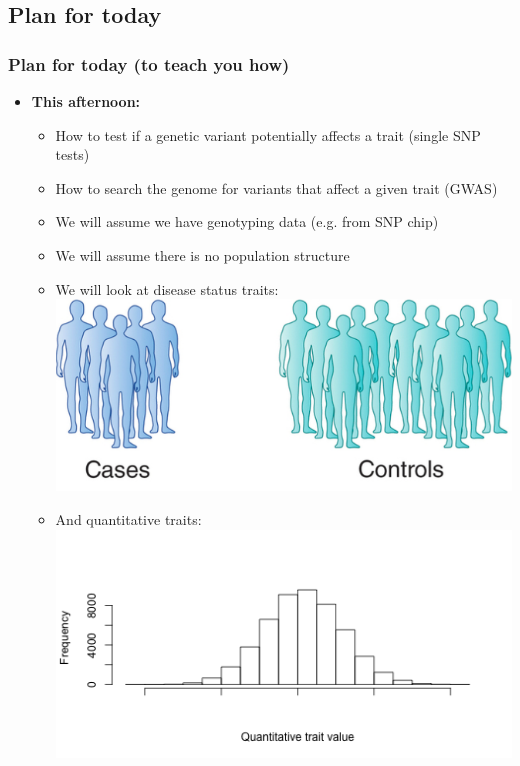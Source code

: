 \documentclass[xcolor=pdftex,dvipsnames,table,10pt]{beamer}
\begin{document}
\subsection{Plan for today}
\begin{frame}
  \frametitle{Plan for today (to teach you how)}
   \small 
    \begin{itemize}\setlength{\itemindent}{-2.5em}
    \item<1-> \textbf{This afternoon:} 
  \begin{itemize}\setlength{\itemindent}{-3.75em}
  \item How to test if a genetic variant potentially affects a trait (single SNP tests)
  \item How to search the genome for variants that affect a given trait (GWAS)
  \item We will assume we have genotyping data (e.g. from SNP chip)
  \item We will assume there is no population structure
  \item We will look at disease status traits:\\\vspace{0.2cm}
     \includegraphics[scale=.2]{cc.png}
     \item And quantitative traits:\\\vspace{-0.9cm}
     \includegraphics[scale=.4]{qtv_hist.png}

\end{itemize}
\end{itemize}
\end{frame}
\end{document}
